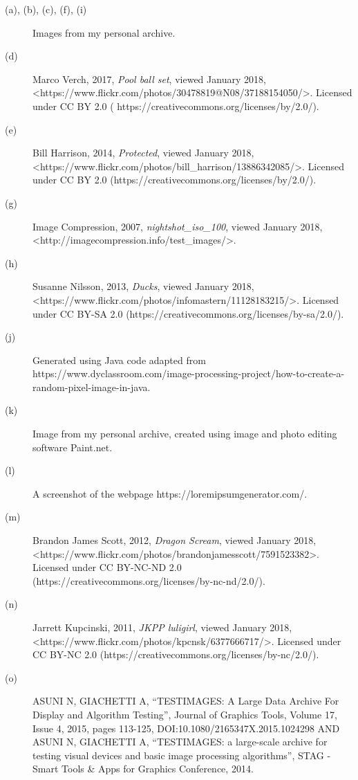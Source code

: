 \documentclass[12pt]{article}
\begin{document}
{
\begin{description}
	\item[(a), (b), (c), (f), (i)] Images from my personal archive.
	\item[(d)] Marco Verch, 2017, \textit{Pool ball set}, viewed January 2018,\\\textless https://www.flickr.com/photos/30478819@N08/37188154050/\textgreater. Licensed under CC BY 2.0 (	https://creativecommons.org/licenses/by/2.0/).
	\item[(e)] Bill Harrison, 2014, \textit{Protected}, viewed January 2018,\\\textless https://www.flickr.com/photos/bill\_harrison/13886342085/\textgreater. Licensed under CC BY 2.0 (https://creativecommons.org/licenses/by/2.0/).
	\item[(g)] Image Compression, 2007, \textit{nightshot\_iso\_100}, viewed January 2018,\\\textless http://imagecompression.info/test\_images/\textgreater.
	\item[(h)] Susanne Nilsson, 2013, \textit{Ducks}, viewed January 2018,\\\textless https://www.flickr.com/photos/infomastern/11128183215/\textgreater. Licensed under CC BY-SA 2.0 (https://creativecommons.org/licenses/by-sa/2.0/).
	\item[(j)] Generated using Java code adapted from https://www.dyclassroom.com/image-processing-project/how-to-create-a-random-pixel-image-in-java.
	\item[(k)] Image from my personal archive, created using image and photo editing software Paint.net.
	\item[(l)] A screenshot of the webpage https://loremipsumgenerator.com/.
	\item[(m)] Brandon James Scott, 2012, \textit{Dragon Scream}, viewed January 2018,\\\textless https://www.flickr.com/photos/brandonjamesscott/7591523382\textgreater. Licensed under CC BY-NC-ND 2.0 (https://creativecommons.org/licenses/by-nc-nd/2.0/).
	\item[(n)] Jarrett Kupcinski, 2011, \textit{JKPP luligirl}, viewed January 2018,\\\textless https://www.flickr.com/photos/kpcnsk/6377666717/\textgreater. Licensed under CC BY-NC 2.0 (https://creativecommons.org/licenses/by-nc/2.0/).
	\item[(o)] ASUNI N, GIACHETTI A, ``TESTIMAGES: A Large Data Archive For Display and Algorithm Testing'', Journal of Graphics Tools, Volume 17, Issue 4, 2015, pages 113-125, DOI:10.1080/2165347X.2015.1024298 AND ASUNI N, GIACHETTI A, ``TESTIMAGES: a large-scale archive for testing visual devices and basic image processing algorithms'', STAG - Smart Tools \& Apps for Graphics Conference, 2014.
\end{description}
}
\end{document}
